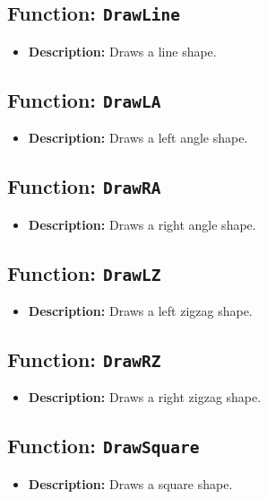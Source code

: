 \documentclass{article}
\begin{document}
\subsection{Function: \texttt{DrawLine}}
\begin{itemize}
    \item \textbf{Description:} Draws a line shape.
\end{itemize}

\subsection{Function: \texttt{DrawLA}}
\begin{itemize}
    \item \textbf{Description:} Draws a left angle shape.
\end{itemize}

\subsection{Function: \texttt{DrawRA}}
\begin{itemize}
    \item \textbf{Description:} Draws a right angle shape.
\end{itemize}

\subsection{Function: \texttt{DrawLZ}}
\begin{itemize}
    \item \textbf{Description:} Draws a left zigzag shape.
\end{itemize}

\subsection{Function: \texttt{DrawRZ}}
\begin{itemize}
    \item \textbf{Description:} Draws a right zigzag shape.
\end{itemize}

\subsection{Function: \texttt{DrawSquare}}
\begin{itemize}
    \item \textbf{Description:} Draws a square shape.
\end{itemize}
\end{document}
